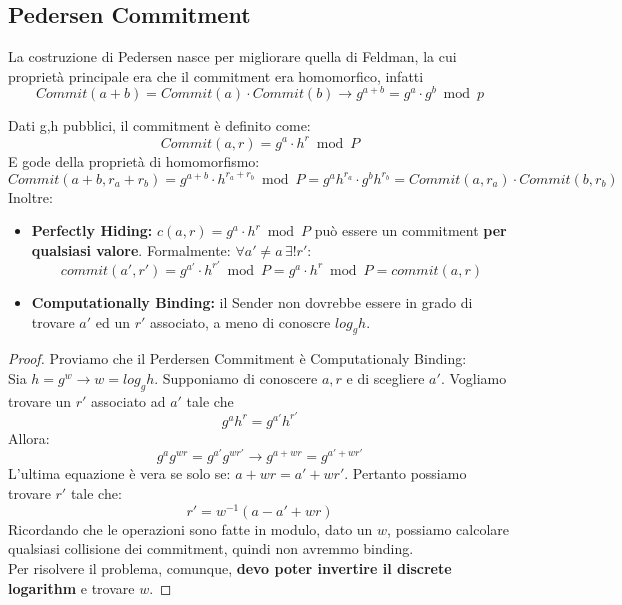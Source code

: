\subsection{Pedersen Commitment}
La costruzione di Pedersen nasce per migliorare quella di Feldman, la cui proprietà principale era che il commitment era homomorfico, infatti 
\[Commit(a+b)=Commit(a)\cdot Commit(b)\rightarrow g^{a+b}=g^a\cdot g^b\bmod p\]
\begin{theorem}\label{thm:pedersen}
Dati g,h pubblici, il commitment è definito come:
\begin{equation}\label{eq:pedersen}
    Commit(a,r)=g^a\cdot h^r\bmod P
\end{equation}
E gode della proprietà di homomorfismo:
\[    Commit(a+b,r_a+r_b)=g^{a+b}\cdot h^{r_a+r_b}\bmod P=g^{a}h^{r_a}\cdot g^{b}h^{r_b}=Commit(a,r_a)\cdot Commit(b,r_b)
\]
Inoltre:
\begin{itemize}
    \item \textbf{Perfectly Hiding:} $c(a,r)=g^a\cdot h^r\bmod P$ può essere un commitment \textbf{per qualsiasi valore}. Formalmente: $\forall a'\ne a\,\exists !r':$ 
    \[commit(a',r')=g^{a'}\cdot h^{r'}\bmod P=g^a\cdot h^r\bmod P=commit(a,r)\]
    \item \textbf{Computationally Binding:} il Sender non dovrebbe essere in grado di trovare $a'$ ed un $r'$ associato, a meno di conoscre $log_g h$. 
\end{itemize}
\end{theorem}
\begin{proof}Proviamo che il Perdersen Commitment è Computationaly Binding:\\
Sia $h=g^w\rightarrow w=log_g h$. Supponiamo di conoscere $a,r$ e di scegliere $a'$. Vogliamo trovare un $r'$ associato ad $a'$ tale che
\begin{equation}\label{eq:proof}
    g^ah^r=g^{a'}h^{r'}
\end{equation}
Allora:
\begin{equation*}
    g^ag^{wr}=g^{a'}g^{wr'}\rightarrow     g^{a+wr}=g^{a'+wr'}
\end{equation*}
L'ultima equazione è vera se solo se: $a+wr=a'+wr'$. Pertanto possiamo trovare $r'$ tale che:
\[r'=w^{-1}(a-a'+wr)\]
Ricordando che le operazioni sono fatte in modulo, dato un $w$, possiamo calcolare qualsiasi collisione dei commitment, quindi non avremmo binding.\\
Per risolvere il problema, comunque, \textbf{devo poter invertire il discrete logarithm} e trovare $w$.
\end{proof}
